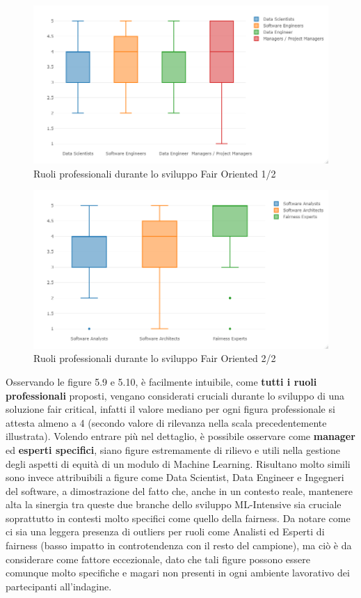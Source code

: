 	  \begin{figure}[h!]
        \centering
        \includegraphics[width=1\textwidth]{figure/Analisi/RQ2/RoleImpactBoxPlot1.png}
        \caption{Ruoli professionali durante lo sviluppo Fair Oriented 1/2}
    \end{figure}
    
     \begin{figure}[h!]
        \centering
        \includegraphics[width=1\textwidth]{figure/Analisi/RQ2/RoleImpactBoxPlot2.png}
        \caption{Ruoli professionali durante lo sviluppo Fair Oriented 2/2}
    \end{figure}
	 
	 
	 Osservando le figure 5.9 e 5.10, è facilmente intuibile, come \textbf{tutti i ruoli professionali} proposti, vengano considerati cruciali durante lo sviluppo di una soluzione fair critical, infatti il valore mediano per ogni figura professionale si attesta almeno a 4 (secondo valore di rilevanza nella scala precedentemente illustrata). Volendo entrare più nel dettaglio, è possibile osservare come \textbf{manager} ed \textbf{esperti specifici}, siano figure estremamente di rilievo e utili nella gestione degli aspetti di equità di un modulo di Machine Learning. Risultano molto simili sono invece attribuibili a figure come Data Scientist, Data Engineer e Ingegneri del software, a dimostrazione del fatto che, anche in un contesto reale, mantenere alta la sinergia tra queste due branche dello sviluppo ML-Intensive sia cruciale soprattutto in contesti molto specifici come quello della fairness. Da notare come ci sia una leggera presenza di outliers per ruoli come Analisti ed Esperti di fairness (basso impatto in controtendenza con il resto del campione), ma ciò è da considerare come fattore eccezionale, dato che tali figure possono essere comunque molto specifiche e magari non presenti in ogni ambiente lavorativo dei partecipanti all'indagine.
	 
